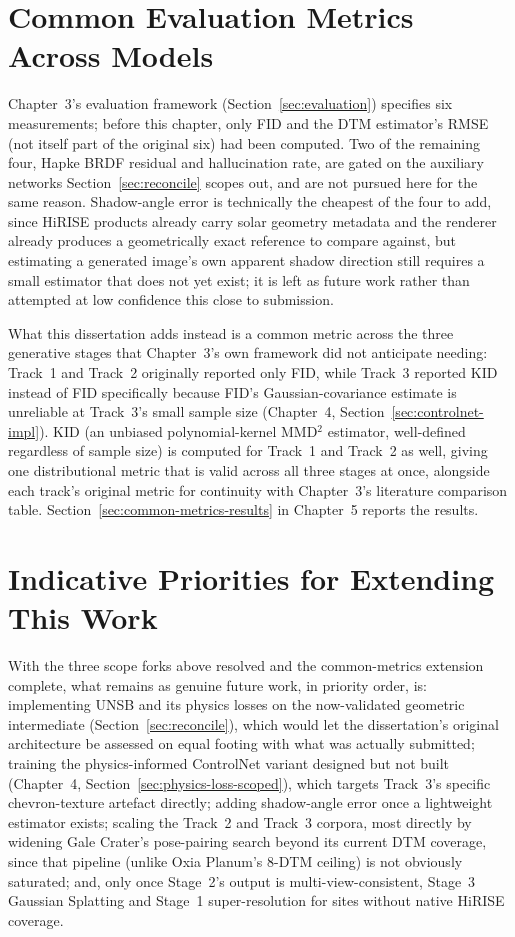 \section{Common Evaluation Metrics Across Models}
\label{sec:eval-extend}

Chapter~3's evaluation framework (Section~\ref{sec:evaluation}) specifies six measurements; before this chapter, only FID and the DTM estimator's RMSE (not itself part of the original six) had been computed. Two of the remaining four, Hapke BRDF residual and hallucination rate, are gated on the auxiliary networks Section~\ref{sec:reconcile} scopes out, and are not pursued here for the same reason. Shadow-angle error is technically the cheapest of the four to add, since HiRISE products already carry solar geometry metadata and the renderer already produces a geometrically exact reference to compare against, but estimating a generated image's own apparent shadow direction still requires a small estimator that does not yet exist; it is left as future work rather than attempted at low confidence this close to submission.

What this dissertation adds instead is a common metric across the three generative stages that Chapter~3's own framework did not anticipate needing: Track~1 and Track~2 originally reported only FID, while Track~3 reported KID instead of FID specifically because FID's Gaussian-covariance estimate is unreliable at Track~3's small sample size (Chapter~4, Section~\ref{sec:controlnet-impl}). KID (an unbiased polynomial-kernel MMD$^2$ estimator, well-defined regardless of sample size) is computed for Track~1 and Track~2 as well, giving one distributional metric that is valid across all three stages at once, alongside each track's original metric for continuity with Chapter~3's literature comparison table. Section~\ref{sec:common-metrics-results} in Chapter~5 reports the results.

\section{Indicative Priorities for Extending This Work}
\label{sec:timeline}

With the three scope forks above resolved and the common-metrics extension complete, what remains as genuine future work, in priority order, is: implementing UNSB and its physics losses on the now-validated geometric intermediate (Section~\ref{sec:reconcile}), which would let the dissertation's original architecture be assessed on equal footing with what was actually submitted; training the physics-informed ControlNet variant designed but not built (Chapter~4, Section~\ref{sec:physics-loss-scoped}), which targets Track~3's specific chevron-texture artefact directly; adding shadow-angle error once a lightweight estimator exists; scaling the Track~2 and Track~3 corpora, most directly by widening Gale Crater's pose-pairing search beyond its current DTM coverage, since that pipeline (unlike Oxia Planum's 8-DTM ceiling) is not obviously saturated; and, only once Stage~2's output is multi-view-consistent, Stage~3 Gaussian Splatting and Stage~1 super-resolution for sites without native HiRISE coverage.
